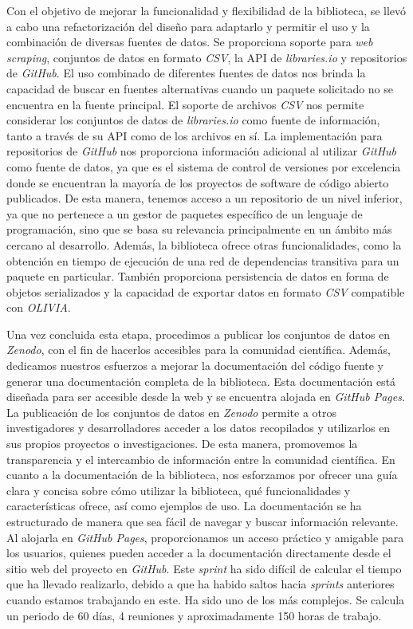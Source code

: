 Con el objetivo de mejorar la funcionalidad y flexibilidad de la biblioteca, se llevó a cabo una refactorización del 
diseño para adaptarlo y permitir el uso y la combinación de diversas fuentes de datos. Se proporciona soporte para 
\textit{web scraping}, conjuntos de datos en formato \textit{CSV}, la API de \textit{libraries.io} y repositorios de 
\textit{GitHub}.
El uso combinado de diferentes fuentes de datos nos brinda la capacidad de buscar en fuentes alternativas cuando un 
paquete solicitado no se encuentra en la fuente principal. El soporte de archivos \textit{CSV} nos permite considerar 
los conjuntos de datos de \textit{libraries.io} como fuente de información, tanto a través de su API como de los archivos 
en sí. La implementación para repositorios de \textit{GitHub} nos proporciona información adicional al utilizar 
\textit{GitHub} como fuente de datos, ya que es el sistema de control de versiones por excelencia donde se encuentran 
la mayoría de los proyectos de software de código abierto publicados. De esta manera, tenemos acceso a un repositorio 
de un nivel inferior, ya que no pertenece a un gestor de paquetes específico de un lenguaje de programación, sino que 
se basa su relevancia principalmente en un ámbito más cercano al desarrollo.
Además, la biblioteca ofrece otras funcionalidades, como la obtención en tiempo de ejecución de una red de dependencias 
transitiva para un paquete en particular. También proporciona persistencia de datos en forma de objetos serializados y 
la capacidad de exportar datos en formato \textit{CSV} compatible con \textit{OLIVIA}.

Una vez concluida esta etapa, procedimos a publicar los conjuntos de datos en \textit{Zenodo}\cite{daniel_alonso_bascones_2023_8095863}, con el fin de hacerlos 
accesibles para la comunidad científica. Además, dedicamos nuestros esfuerzos a mejorar la documentación del código 
fuente y generar una documentación completa de la biblioteca. Esta documentación está diseñada para ser accesible desde
 la web y se encuentra alojada en \textit{GitHub Pages}\cite{olivia_finder_docpages}.
La publicación de los conjuntos de datos en \textit{Zenodo} permite a otros investigadores y desarrolladores acceder a 
los datos recopilados y utilizarlos en sus propios proyectos o investigaciones. De esta manera, promovemos la transparencia 
y el intercambio de información entre la comunidad científica.
En cuanto a la documentación de la biblioteca, nos esforzamos por ofrecer una guía clara y concisa sobre cómo utilizar 
la biblioteca, qué funcionalidades y características ofrece, así como ejemplos de uso. La documentación se ha estructurado 
de manera que sea fácil de navegar y buscar información relevante. Al alojarla en \textit{GitHub Pages}, proporcionamos 
un acceso práctico y amigable para los usuarios, quienes pueden acceder a la documentación directamente desde el sitio web
 del proyecto en \textit{GitHub}.
Este \textit{sprint} ha sido difícil de calcular el tiempo que ha llevado realizarlo, debido a que ha habido saltos 
hacia \textit{sprints} anteriores cuando estamos trabajando en este. Ha sido uno de los más complejos. Se calcula un 
periodo de 60 días, 4 reuniones y aproximadamente 150 horas de trabajo.

